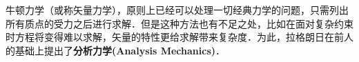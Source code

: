 

牛顿力学（或称矢量力学），原则上已经可以处理一切经典力学的问题，只需列出所有质点的受力之后进行求解．但是这种方法也有不足之处，比如在面对复杂约束时方程将变得难以求解，矢量的特性更给求解带来复杂度．为此，拉格朗日在前人的基础上提出了\textbf{分析力学(Analysis Mechanics)}．